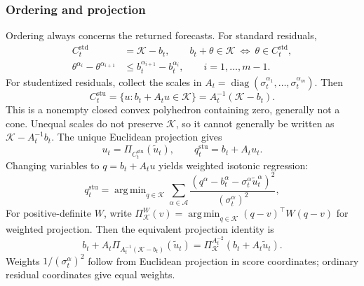 \documentclass[11pt,a4paper]{article}
\newcommand{\A}{\mathcal{A}}
\newcommand{\K}{\mathcal{K}}
\newcommand{\std}{\mathrm{std}}
\newcommand{\stu}{\mathrm{stu}}
\DeclareMathOperator{\diag}{diag}
\DeclareMathOperator*{\argmin}{arg\,min}
\theoremstyle{definition}
\theoremstyle{remark}
\begin{document}
\subsubsection{Ordering and projection}
Ordering always concerns the returned forecasts. For standard residuals,
\begin{align}
 C_t^\std&=\K-b_t,\qquad b_t+\theta\in\K
 \ \Longleftrightarrow\ \theta\in C_t^\std,
 \label{eq:standard-constraint}\\
 \theta^{\alpha_i}-\theta^{\alpha_{i+1}}
 &\le b_t^{\alpha_{i+1}}-b_t^{\alpha_i},\qquad i=1,\ldots,m-1.
 \label{eq:standard-adjacent}
\end{align}
For studentized residuals, collect the scales in
$A_t=\diag(\sigma_t^{\alpha_1},\ldots,\sigma_t^{\alpha_m})$. Then
\begin{equation}
 C_t^\stu=\{u:b_t+A_tu\in\K\}=A_t^{-1}(\K-b_t).
 \label{eq:student-constraint}
\end{equation}
This is a nonempty closed convex polyhedron containing zero, generally
not a cone. Unequal scales do not preserve $\K$, so it cannot generally
be written as $\K-A_t^{-1}b_t$. The unique Euclidean projection gives
\begin{equation}
 u_t=\Pi_{C_t^\stu}(\tilde u_t),\qquad q_t^\stu=b_t+A_tu_t.
 \label{eq:student-projection}
\end{equation}
Changing variables to $q=b_t+A_tu$ yields weighted isotonic regression:
\begin{equation}
 q_t^\stu=\argmin_{q\in\K}\sum_{\alpha\in\A}
 \frac{(q^\alpha-b_t^\alpha-\sigma_t^\alpha\tilde u_t^\alpha)^2}
 {(\sigma_t^\alpha)^2},
 \label{eq:weighted-projection}
\end{equation}
For positive-definite $W$, write
$\Pi_\K^W(v)=\argmin_{q\in\K}(q-v)^\top W(q-v)$ for weighted
projection. Then the equivalent projection identity is
\begin{equation}
 b_t+A_t\Pi_{A_t^{-1}(\K-b_t)}(\tilde u_t)
 =\Pi_\K^{A_t^{-2}}(b_t+A_t\tilde u_t).
 \label{eq:projection-identity}
\end{equation}
Weights $1/(\sigma_t^\alpha)^2$ follow from Euclidean projection in
score coordinates; ordinary residual coordinates give equal weights.
\end{document}
